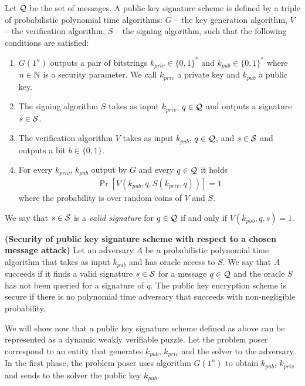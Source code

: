 \begin{definition}
Let $\mathcal{Q}$ be the set of messages. A \textnormal{public key signature scheme} is defined by a triple of probabilistic polynomial time algorithms:
$G$ -- the key generation algorithm,
$V$ -- the verification algorithm,
$S$ -- the signing algorithm,
such that the following conditions are satisfied:
\begin{enumerate}[-]
  \item $G(1^n)$ outputs a pair of bitstrings $k_{priv} \in \{0,1\}^{*}$ and $k_{pub} \in \{0,1\}^{*}$ where $n \in \mathbb{N}$ is a security parameter.
    We call $k_{priv}$ a private key and $k_{pub}$ a public key.
  \item The signing algorithm $S$ takes as input $k_{priv}$, $q \in \mathcal{Q}$ and outputs a signature $s \in \mathcal{S}$.
  \item The verification algorithm $V$ takes as input $k_{pub}$, $q \in \mathcal{Q}$, and $s \in \mathcal{S}$ and outputs a bit $b \in \{0,1\}$.
  \item For every $k_{priv}$, $k_{pub}$ output by $G$ and every $q \in \mathcal{Q}$ it holds
    \begin{align*}
      \Pr[V(k_{pub}, q, S(k_{priv}, q))] = 1
    \end{align*}
    where the probability is over random coins of $V$ and $S$.
\end{enumerate}
\end{definition}
We say that $s \in \mathcal{S}$ is a \textit{valid signature} for $q \in \mathcal{Q}$ if and only if $V(k_{pub}, q, s) = 1$.
%
%
\begin{definition}\textbf{(Security of public key signature scheme with respect to a chosen message attack)}
Let an \textnormal{adversary} $A$ be a probabilistic polynomial time algorithm that takes as input $k_{pub}$ and has oracle access to $S$.
We say that $A$ \textnormal{succeeds} if it finds a valid signature $s \in \mathcal{S}$ for a message $q \in \mathcal{Q}$ and the oracle $S$ has not been queried for a signature of $q$.
The public key encryption scheme is \textnormal{secure} if there is no polynomial time adversary that succeeds with non-negligible probability.
\end{definition}
%
We will show now that a public key signature scheme defined as above can be represented as a dynamic weakly verifiable puzzle.
Let the problem poser correspond to an entity that generates $k_{pub}$, $k_{priv}$ and the solver to the adversary.
In the first phase, the problem poser uses algorithm $G(1^n)$ to obtain $k_{pub}$, $k_{priv}$ and sends to the solver the public key $k_{pub}$.
